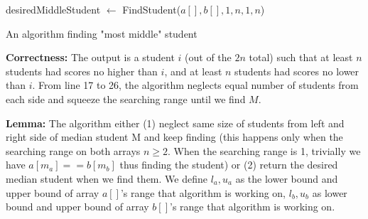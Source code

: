 \documentclass{article}
\begin{document}
\begin{algorithm}[!ht]
\DontPrintSemicolon
{}
      \Fn{\FSub{$a[ ]$,$b[]$, $l_a$, $u_a$, $l_b$, $u_b$}}{ 
      \tcc{we only work on $a[l_a:u_a]$ and $b[l_b:u_b]$}
        $m_a \leftarrow \lfloor\frac{u_a+l_a}{2}\rfloor$
        
        $m_b \leftarrow \lfloor\frac{u_b+l_b}{2}\rfloor$
        
        \If{$a[m_a] < b[m_b]$}{
            \If{$a[m_a+1]<b[m_b+1]$}{
                return FindStudent($a[],b[], m_a+1, u_a, l_b, m_b$)
            } \Else {
                return $b[m_b+1]$
            }
        } \ElseIf{$a[m_a > b[m_b]$} {
            \If{$a[m_a+1]>b[m_b+1]$} {
                return FindStudent($a[],b[],l_a, m_a,m_b+1, u_b$)
            } \Else {
                return $a[m_a+1]$
            }
        } \Else { \tcc{$a[m_a]==b[m_a]$}
            return $a[m_a]$
        }
    }
    
    desiredMiddleStudent $\leftarrow$ FindStudent($a[],b[],1,n,1,n$)
      \;
\caption{An algorithm finding "most middle" student}
\end{algorithm}


\textbf{Correctness:} The output is a student $i$ (out
of the $2n$ total) such that at least $n$ students had scores no higher than $i$, and at least $n$ students had scores no lower than $i$. From line 17 to 26, the algorithm neglects equal number of students from each side and squeeze the searching range until we find $M$.

\textbf{Lemma:} The algorithm either (1) neglect same size of students from left and right side of median student M and keep finding (this happens only when the searching range on both arrays $n\geq 2$. When the searching range is 1, trivially we have $a[m_a] == b[m_b]$ thus finding the student) or (2) return the desired median student when we find them. We define $l_a, u_a$ as the lower bound and upper bound of array $a[]$'s range that algorithm is working on, $l_b, u_b$ as lower bound and upper bound of array $b[]$'s range that algorithm is working on.
\end{document}
